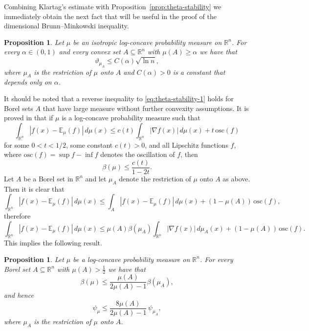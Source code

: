 \documentclass[11pt,leqno]{article}
\newtheorem{proposition}[theorem]{Proposition}
\theoremstyle{definition}
\theoremstyle{remark}
\numberwithin{equation}{section}
\newcommand{\ls}{\leqslant}
\newcommand{\gr}{\geqslant}
\newcommand{\E}{\mathbb{E}}
\newcommand{\1}{\textbf{1}}
\begin{document}
Combining Klartag's estimate with Proposition~\ref{prop:theta-stability} we immediately obtain the next fact that will be useful in the proof of the dimensional Brunn--Minkowski inequality.

\begin{proposition}\label{prop:theta-stability-isotropic}Let $\mu $ be an isotropic log-concave probability measure on $\mathbb{R}^n$. For every $\alpha\in (0,1)$
and every convex set $A\subseteq\mathbb{R}^n$ with $\mu(A)\gr \alpha$ we have that
$$\vartheta_{\mu_A}\ls C(\alpha)\sqrt{\ln n},$$
where $\mu_A$ is the restriction of $\mu$ onto $A$ and $C(\alpha)>0$ is a constant that depends only on $\alpha$. 
\end{proposition}

It should be noted that a reverse inequality to \eqref{eq:theta-stability-1} holds for Borel sets $A$ that have large measure without further convexity assumptions. It is proved in \cite[Proposition~9.2.5]{Cattiaux-Guillin-2020} that if $\mu$ is a log-concave probability measure such that
$$\int_{\mathbb{R}^n} |f(x)-\mathbb{E}_{\mu}(f)|\,d\mu(x)\ls c(t)\int_{\mathbb{R}^n} |\nabla f(x)|\,d\mu(x)+ t\,\mathrm{osc}(f)$$
for some $0<t<1/2$, some constant $c(t)>0$, and all Lipschitz functions $f$, where $\mathrm{osc}(f)=\sup f-\inf f$
denotes the oscillation of $f$, then
$$\beta(\mu)\ls \frac{c(t)}{1-2t}.$$
Let $A$ be a Borel set in $\mathbb{R}^n$ and let $\mu_A$ denote the restriction of $\mu$ onto $A$ as above. Then it is clear that
$$\int_{\mathbb{R}^n} |f(x)-\mathbb{E}_\mu(f)|\,d\mu(x)\ls\int_A |f(x)-\mathbb{E}_\mu(f)|\,d\mu(x)+(1-\mu(A))\,\mathrm{osc}(f),$$
therefore
$$\int_{\mathbb{R}^n} |f(x)-\E_{\mu}(f)|\,d\mu(x)\ls\mu(A)\beta(\mu_A)\int_{\mathbb{R}^n} |\nabla f(x)|\,d\mu_A(x)+(1-\mu(A))\,\mathrm{osc}(f).$$
This implies the following result.

\begin{proposition}\label{prop:theta-stability-reverse}Let $\mu $ be a log-concave probability measure on $\mathbb{R}^n$. For every Borel 
set $A\subseteq\mathbb{R}^n$ with $\mu(A)>\tfrac{1}{2}$ we have that
$$\beta(\mu)\ls \frac{\mu(A)}{2\mu(A)-1}\beta(\mu_A),$$
and hence
\begin{equation}\label{eq:theta-stability-reverse}\psi_{\mu}\ls  \frac{8\mu(A)}{2\mu(A)-1}\,\psi_{\mu_A},\end{equation}
where $\mu_A$ is the restriction of $\mu$ onto $A$. 
\end{proposition}

\bigskip 


\end{document}
